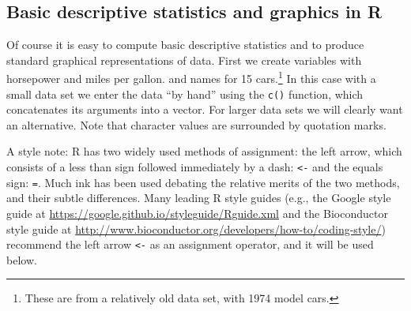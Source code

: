 \subsection{Basic descriptive statistics and graphics in R}\label{sec:dec}
Of course it is easy to compute basic descriptive statistics and to produce standard graphical representations of data. First we create variables with horsepower and miles per gallon. and names for 15 cars.\footnote{These are from a relatively old data set, with 1974 model cars.} In this case with a small data set we enter the data ``by hand'' using the \verb+c()+ function, which concatenates its arguments into a vector. For larger data sets we will clearly want an alternative. Note that character values are surrounded by quotation marks.

A style note: R has two widely used methods of assignment: the left arrow, which consists of a less than sign followed immediately by a dash: \verb+<-+ and the equals sign: \verb+=+. Much ink has been used debating the relative merits of the two methods, and their subtle differences. Many leading R style guides (e.g., the Google style guide at \url{https://google.github.io/styleguide/Rguide.xml} and the Bioconductor style guide at \url{http://www.bioconductor.org/developers/how-to/coding-style/}) recommend the left arrow \verb+<-+ as an assignment operator, and it will be used below. 

